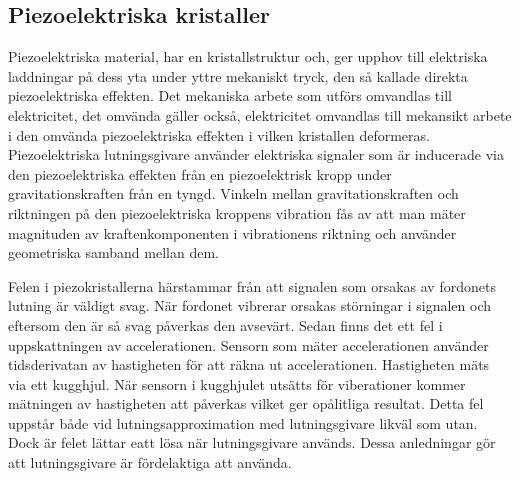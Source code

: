 \subsection{Piezoelektriska kristaller}
Piezoelektriska material, har en kristallstruktur och, ger upphov till
elektriska laddningar på dess yta under yttre mekaniskt tryck, den så kallade
direkta piezoelektriska effekten.
Det mekaniska arbete som utförs omvandlas till elektricitet, det omvända gäller
också, elektricitet omvandlas till mekansikt arbete i den omvända
piezoelektriska effekten i vilken kristallen deformeras.
\autocite{electronicdesign2016}
Piezoelektriska lutningsgivare använder elektriska signaler som är
inducerade via den piezoelektriska effekten från en piezoelektrisk kropp
under gravitationskraften från en tyngd.
Vinkeln mellan gravitationskraften och
riktningen på den piezoelektriska kroppens vibration
fås av att man mäter magnituden av kraftenkomponenten i vibrationens riktning
och använder geometriska samband mellan dem.
\autocite{chiang00}

Felen i piezokristallerna härstammar från att signalen som orsakas av fordonets
lutning är väldigt svag.
När fordonet vibrerar orsakas störningar i signalen och eftersom den är så svag
påverkas den avsevärt.
Sedan finns det ett fel i uppskattningen av accelerationen.
Sensorn som mäter accelerationen använder tidsderivatan av hastigheten för
att räkna ut accelerationen.
Hastigheten mäts via ett kugghjul.
När sensorn i kugghjulet utsätts för viberationer kommer mätningen av
hastigheten att påverkas vilket ger opålitliga resultat.
Detta fel uppstår både vid lutningsapproximation med lutningsgivare likväl som utan.
Dock är felet lättar eatt lösa när lutningsgivare används.
Dessa anledningar gör att lutningsgivare är fördelaktiga att använda.

